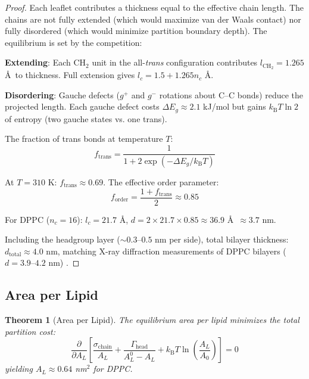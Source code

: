 \documentclass[twocolumn,10pt]{article}
\newtheorem{theorem}{Theorem}[section]
\theoremstyle{remark}
\newcommand{\kB}{k_{\mathrm{B}}}
\begin{document}
\begin{proof}
Each leaflet contributes a thickness equal to the effective chain length. The chains are not fully extended (which would maximize van der Waals contact) nor fully disordered (which would minimize partition boundary depth). The equilibrium is set by the competition:

\textbf{Extending}: Each CH$_2$ unit in the all-\emph{trans} configuration contributes $l_{\text{CH}_2} = 1.265$ \AA\ to thickness. Full extension gives $l_c = 1.5 + 1.265 n_c$ \AA.

\textbf{Disordering}: Gauche defects ($g^+$ and $g^-$ rotations about C--C bonds) reduce the projected length. Each gauche defect costs $\Delta E_g \approx 2.1$ kJ/mol but gains $\kB T \ln 2$ of entropy (two gauche states vs. one trans).

The fraction of trans bonds at temperature $T$:
\begin{equation}
    f_{\text{trans}} = \frac{1}{1 + 2\exp(-\Delta E_g / \kB T)}
\end{equation}

At $T = 310$ K: $f_{\text{trans}} \approx 0.69$. The effective order parameter:
\begin{equation}
    f_{\text{order}} = \frac{1 + f_{\text{trans}}}{2} \approx 0.85
\end{equation}

For DPPC ($n_c = 16$): $l_c = 21.7$ \AA, $d = 2 \times 21.7 \times 0.85 \approx 36.9$ \AA\ $\approx 3.7$ nm.

Including the headgroup layer ($\sim 0.3$--$0.5$ nm per side), total bilayer thickness: $d_{\text{total}} \approx 4.0$ nm, matching X-ray diffraction measurements of DPPC bilayers ($d = 3.9$--$4.2$ nm) \cite{nagle2000,kucerka2011}.
\end{proof}

\subsection{Area per Lipid}

\begin{theorem}[Area per Lipid]
\label{thm:area}
The equilibrium area per lipid minimizes the total partition cost:
\begin{equation}
    \frac{\partial}{\partial A_L}\left[\frac{\sigma_{\text{chain}}}{A_L} + \frac{\Gamma_{\text{head}}}{A_L^0 - A_L} + \kB T \ln\left(\frac{A_L}{A_0}\right)\right] = 0
\end{equation}
yielding $A_L \approx 0.64$ nm$^2$ for DPPC.
\end{theorem}
\end{document}
